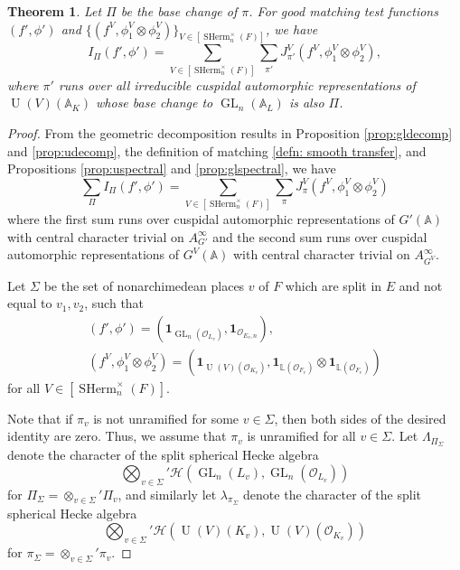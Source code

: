 \documentclass[11pt, reqno]{amsart}
\numberwithin{equation}{subsection}
\theoremstyle{plain}
\newtheorem{theorem}[proposition]{Theorem}
\theoremstyle{definition}
\renewcommand{\AA}{\mathbb A}
\newcommand{\cH}{\mathcal H}
\newcommand{\LL}{\mathbb L}
\renewcommand{\O}{\mathcal O}
\DeclareMathOperator{\GL}{GL}
\DeclareMathOperator{\SHerm}{SHerm}
\DeclareMathOperator{\U}{U}
\begin{document}
\begin{theorem}
\label{prop:identity}
Let $\Pi$ be the base change of $\pi$.
For good matching test functions $(f',\phi')$
and $\{(f^V,\phi_1^V \otimes \phi_2^V) \}_{V\in [\SHerm_n^\times(F)]}$, we have
    \[
        I_\Pi(f', \phi') =
        \sum_{V \in [\SHerm_n^\times(F)]} \sum_{\pi'} J_{\pi'}^V(f^V, \phi_1^V \otimes \phi_2^V),
    \]
where $\pi'$ runs over all irreducible cuspidal
automorphic representations of $\U(V)(\AA_K)$
whose base change to $\GL_n(\AA_L)$ is also
$\Pi$.
\end{theorem}   
\begin{proof}

From the geometric decomposition results in Proposition 
\ref{prop:gldecomp} and \ref{prop:udecomp},
the definition of matching
\ref{defn: smooth transfer}, and Propositions
\ref{prop:uspectral} and \ref{prop:glspectral},
we have 
\[
    \sum_{\Pi} I_\Pi(f', \phi') =
    \sum_{V \in [\SHerm_n^\times(F)]} \sum_{\pi} 
    J^V_\pi(f^V, \phi_1^V \otimes \phi_2^V)
\]
where the first sum runs over cuspidal automorphic 
representations of $G'(\AA)$ with central
character trivial on $A_{G'}^{\infty}$ and the second sum runs over
cuspidal automorphic representations of $G^V(\AA)$ 
with central character trivial on $A_{G^V}^{\infty}$.

Let $\Sigma$ be the set of nonarchimedean places $v$
of $F$ which are split in $E$ and not equal to
$v_1, v_2$, such that
\begin{gather*}
    (f', \phi') = (\mathbf{1}_{\GL_n(\O_{L_v})}, \mathbf{1}_{\O_{E_v,n}}),\\ 
    (f^V, \phi_1^V \otimes \phi_2^V) =
    (\mathbf{1}_{\U(V)(\O_{K_v})}, \mathbf{1}_{\LL(\O_{F_v})} \otimes
    \mathbf{1}_{\LL(\O_{F_v})})
\end{gather*}
for all $V \in [\SHerm_n^\times(F)]$.

Note that if $\pi_v$ is not unramified for some
$v \in \Sigma$, then both sides of the desired identity
are zero. Thus, we assume that $\pi_v$ is unramified
for all $v \in \Sigma$.
Let $\Lambda_{\Pi_{\Sigma}}$ denote the character
of the split spherical Hecke algebra
\[
    \bigotimes_{v \in \Sigma}'
    \cH(\GL_n(L_v), \GL_n(\O_{L_v}))
\]
for $\Pi_\Sigma = \otimes_{v \in \Sigma}' \Pi_v$,
and similarly let $\lambda_{\pi_\Sigma}$ denote
the character of the split spherical Hecke algebra
\[
    \bigotimes_{v \in \Sigma}'
    \cH(\U(V)(K_v), \U(V)(\O_{K_v}))
\]
for $\pi_\Sigma = \otimes_{v \in \Sigma}' \pi_v$.





\end{proof}
\end{document}
